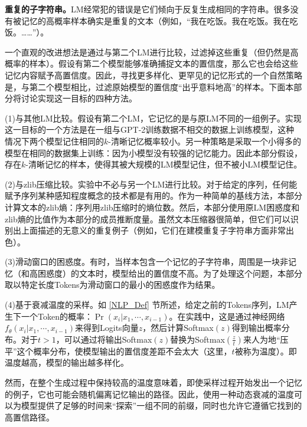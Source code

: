 \textbf{重复的子字符串。}LM经常犯的错误是它们倾向于反复生成相同的字符串。很多没有被记忆的高概率样本确实是重复的文本（例如，“我在吃饭。我在吃饭。我在吃饭。……”）。

一个直观的改进想法是通过与第二个LM进行比较，过滤掉这些重复（但仍然是高概率的样本）。假设有第二个模型能够准确捕捉文本的置信度，那么它也会给这些记忆内容赋予高置信度。因此，寻找更多样化、更罕见的记忆形式的一个自然策略是，与第二个模型相比，过滤原始模型的置信度“出乎意料地高”的样本。下面本部分将讨论实现这一目标的四种方法。

(1)与其他LM比较。假设有第二个LM，它记忆的是与原LM不同的一组例子。实现这一目标的一个方法是在一组与GPT-2训练数据不相交的数据上训练模型，这种情况下两个模型记住相同的$k$-清晰记忆概率较小。另一种策略是采取一个小得多的模型在相同的数据集上训练：因为小模型没有较强的记忆能力。因此本部分假设，存在$k$-清晰记忆的样本，使得其被大规模的LM模型记住，但不被小LM模型记住。

(2)与zlib压缩比较。实验中不必与另一个LM进行比较。对于给定的序列，任何能赋予序列某种感知程度概念的技术都是有用的。作为一种简单的基线方法，本部分计算文本的zlib熵\cite{zlib}：序列用zlib压缩时的熵位数。然后，本部分使用原LM困惑度和zlib熵的比值作为本部分的成员推断度量。虽然文本压缩器很简单，但它们可以识别出上面描述的无意义的重复例子（例如，它们在建模重复子字符串方面非常出色）。

(3)滑动窗口的困惑度。有时，当样本包含一个记忆的子字符串，周围是一块非记忆（和高困惑度）的文本时，模型给出的置信度不高。为了处理这个问题，本部分取以特定长度Tokens为滑动窗口的最小的困惑度作为结果。

(4)基于衰减温度的采样。如 \ref{NLP_Def} 节所述，给定之前的Tokens序列，LM产生下一个Token的概率：$\Pr(x_i |x_1,⋯,x_{i-1} )$。在实践中，这是通过神经网络$f_\theta(x_i|x_1,⋯,x_{i-1})$来得到Logits向量$z$，然后计算Softmax$(z)$得到输出概率分布。对于$t>1$，可以通过将输出Softmax$(z)$替换为Softmax$(\frac{z}{t})$来人为地“压平”这个概率分布，使模型输出的置信度差距不会太大（这里，$t$被称为温度）。即温度越高，模型的输出越多样化。

然而，在整个生成过程中保持较高的温度意味着，即使采样过程开始发出一个记忆的例子，它也可能会随机偏离记忆输出的路径。因此，使用一种动态衰减的温度可以为模型提供了足够的时间来“探索”一组不同的前缀，同时也允许它遵循它找到的高置信路径。

